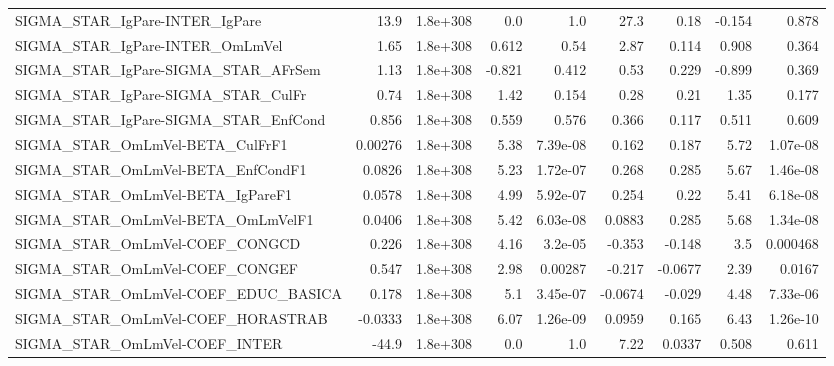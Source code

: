 \begin{tabular}{lrrrrrrrr}
SIGMA\_STAR\_IgPare-INTER\_IgPare        &        13.9 &     1.8e+308 &      0.0 &      1.0 &       27.3 &        0.18 &       -0.154 &         0.878 \\
SIGMA\_STAR\_IgPare-INTER\_OmLmVel       &        1.65 &     1.8e+308 &    0.612 &     0.54 &       2.87 &       0.114 &        0.908 &         0.364 \\
SIGMA\_STAR\_IgPare-SIGMA\_STAR\_AFrSem   &        1.13 &     1.8e+308 &   -0.821 &    0.412 &       0.53 &       0.229 &       -0.899 &         0.369 \\
SIGMA\_STAR\_IgPare-SIGMA\_STAR\_CulFr    &        0.74 &     1.8e+308 &     1.42 &    0.154 &       0.28 &        0.21 &         1.35 &         0.177 \\
SIGMA\_STAR\_IgPare-SIGMA\_STAR\_EnfCond  &       0.856 &     1.8e+308 &    0.559 &    0.576 &      0.366 &       0.117 &        0.511 &         0.609 \\
SIGMA\_STAR\_OmLmVel-BETA\_CulFrF1       &     0.00276 &     1.8e+308 &     5.38 & 7.39e-08 &      0.162 &       0.187 &         5.72 &      1.07e-08 \\
SIGMA\_STAR\_OmLmVel-BETA\_EnfCondF1     &      0.0826 &     1.8e+308 &     5.23 & 1.72e-07 &      0.268 &       0.285 &         5.67 &      1.46e-08 \\
SIGMA\_STAR\_OmLmVel-BETA\_IgPareF1      &      0.0578 &     1.8e+308 &     4.99 & 5.92e-07 &      0.254 &        0.22 &         5.41 &      6.18e-08 \\
SIGMA\_STAR\_OmLmVel-BETA\_OmLmVelF1     &      0.0406 &     1.8e+308 &     5.42 & 6.03e-08 &     0.0883 &       0.285 &         5.68 &      1.34e-08 \\
SIGMA\_STAR\_OmLmVel-COEF\_CONGCD        &       0.226 &     1.8e+308 &     4.16 &  3.2e-05 &     -0.353 &      -0.148 &          3.5 &      0.000468 \\
SIGMA\_STAR\_OmLmVel-COEF\_CONGEF        &       0.547 &     1.8e+308 &     2.98 &  0.00287 &     -0.217 &     -0.0677 &         2.39 &        0.0167 \\
SIGMA\_STAR\_OmLmVel-COEF\_EDUC\_BASICA   &       0.178 &     1.8e+308 &      5.1 & 3.45e-07 &    -0.0674 &      -0.029 &         4.48 &      7.33e-06 \\
SIGMA\_STAR\_OmLmVel-COEF\_HORASTRAB     &     -0.0333 &     1.8e+308 &     6.07 & 1.26e-09 &     0.0959 &       0.165 &         6.43 &      1.26e-10 \\
SIGMA\_STAR\_OmLmVel-COEF\_INTER         &       -44.9 &     1.8e+308 &      0.0 &      1.0 &       7.22 &      0.0337 &        0.508 &         0.611 \\

\end{tabular}
